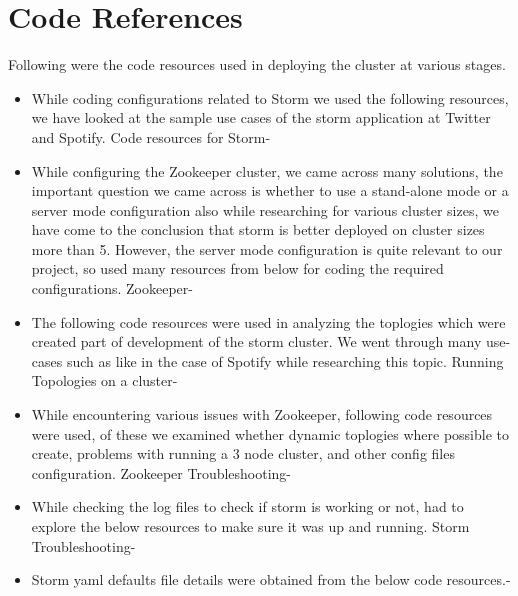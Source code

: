 \documentclass[9pt,twocolumn,twoside]{../../styles/osajnl}
\begin{document}
\section{Code References}
Following were the code resources used in deploying the cluster at various
stages.
\begin{itemize}
\item
  While coding configurations related to Storm we used the following
  resources, we have looked at the sample use cases of the storm
  application at Twitter and Spotify. Code resources for
  Storm-\cite{www-storm1}\cite{www-storm2}\cite{www-storm3}\cite{www-storm4}\cite{www-storm5}\cite{www-storm6}\cite{www-storm7}\cite{www-storm8}\cite{www-storm9}\cite{www-storm10}
\item
 While configuring the Zookeeper cluster, we came across many
 solutions, the important question we came across is whether to use a
 stand-alone mode or a server mode configuration also while
 researching for various cluster sizes, we have come to the conclusion
 that storm is better deployed on cluster sizes more than 5. However,
 the server mode configuration is quite relevant to our project, so
 used many resources from below for coding the required
 configurations. Zookeeper-\cite{www-zk1}\cite{www-zk2}\cite{www-zk3}\cite{www-zk4}\cite{www-zk5}\cite{www-zk6}\cite{www-zk7}\cite{www-zk8}
\item The following code resources were used in analyzing the
  toplogies which were created part of development of the storm
  cluster. We went through many use-cases such as like in the case of
  Spotify while researching this topic. Running Topologies on a
  cluster-\cite{www-rtc1}\cite{www-rtc2}\cite{www-rtc3}\cite{www-rtc4}\cite{www-rtc5}\cite{www-rtc6}
\item While encountering various issues with Zookeeper, following code
  resources were used, of these we examined whether dynamic toplogies
  where possible to create, problems with running a 3 node cluster,
  and other config files configuration. Zookeeper
  Troubleshooting-\cite{www-zt1}\cite{www-zt2}\cite{www-zt3}\cite{www-zt4}\cite{www-zt5}\cite{www-zt6}
\item While checking the log files to check if storm is working or
  not, had to explore the below resources to make sure it was up and
  running. Storm
  Troubleshooting-\cite{www-nnf1}\cite{www-nnf2}\cite{www-nnf3}\cite{www-nnf4}
\item Storm yaml defaults file details were obtained from the below
  code resources.-\cite{www-sd1}
\end{itemize}
\end{document}

